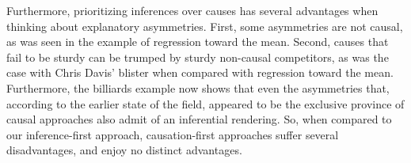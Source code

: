 \documentclass[natbib]{svjour3}                     %
\begin{document}
Furthermore, prioritizing inferences over causes has several advantages when thinking about explanatory asymmetries. First, some asymmetries are not causal, as was seen in the example of regression toward the mean. Second, causes that fail to be sturdy can be trumped by sturdy non-causal competitors, as was the case with Chris Davis' blister when compared with regression toward the mean. Furthermore, the billiards example now shows that even the asymmetries that, according to the earlier state of the field, appeared to be the exclusive province of causal approaches also admit of an inferential rendering. So, when compared to our inference-first approach, causation-first approaches suffer several disadvantages, and enjoy no distinct advantages. 

%
\end{document}
